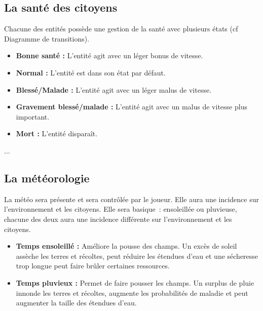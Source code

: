 \documentclass[a4paper]{article}
\begin{document}
\subsection*{La santé des citoyens}
Chacune des entités possède une gestion de la santé avec plusieurs états (cf Diagramme de transitions).
\begin{itemize}
\item \textbf{Bonne santé :} \small{ L'entité agit avec un léger bonus de vitesse.}
\item \textbf{Normal :} \small{ L'entité est dans son état par défaut.}
\item \textbf{Blessé/Malade :} \small{ L'entité agit avec un léger malus de vitesse.}
\item \textbf{Gravement blessé/malade :} \small{ L'entité agit avec un malus de vitesse plus important.}
\item \textbf{Mort :} \small{ L'entité disparaît.}
\end{itemize}
...

\subsection*{La météorologie}
La météo sera présente et sera contrôlée par le joueur. Elle aura une incidence sur l'environnement et les citoyens. Elle sera basique : ensoleillée ou pluvieuse, chacune des deux aura une incidence différente sur l'environnement et les citoyens. 
\begin{itemize}
\item \textbf{Temps ensoleillé :} \small{ Améliore la pousse des champs. Un excès de soleil assèche les terres et récoltes, peut réduire les étendues d'eau et une sécheresse trop longue peut faire brûler certaines ressources.}
\item \textbf{Temps pluvieux :} \small{ Permet de faire pousser les champs. Un surplus de pluie innonde les terres et récoltes, augmente les probabilités de maladie et peut augmenter la taille des étendues d'eau.}
\end{itemize}
\end{document}
